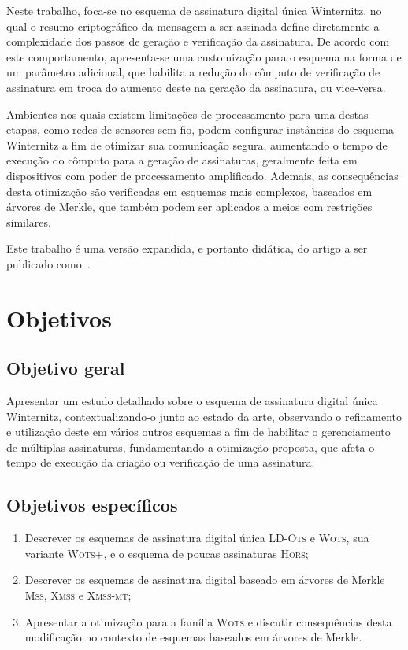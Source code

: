 \documentclass{ufsctex/ufsctex}
\newcommand{\lots}{\textsc{LD-Ots}}
\newcommand{\wots}{\textsc{Wots}}
\newcommand{\wotsplus}{\textsc{Wots+}}
\newcommand{\hors}{\textsc{Hors}}
\newcommand{\mss}{\textsc{Mss}}
\newcommand{\xmss}{\textsc{Xmss}}
\newcommand{\xmssmt}{\textsc{Xmss-mt}}
\begin{document}
Neste trabalho, foca-se no esquema de assinatura digital única Winternitz, no
qual o resumo criptográfico da mensagem a ser assinada define diretamente a
complexidade dos passos de geração e verificação da assinatura. De acordo com
este comportamento, apresenta-se uma customização para o esquema na forma de um
parâmetro adicional, que habilita a redução do cômputo de verificação de
assinatura em troca do aumento deste na geração da assinatura, ou vice-versa.

Ambientes nos quais existem limitações de processamento para uma destas etapas,
como redes de sensores sem fio, podem configurar instâncias do esquema
Winternitz a fim de otimizar sua comunicação segura, aumentando o tempo de
execução do cômputo para a geração de assinaturas, geralmente feita em
dispositivos com poder de processamento amplificado. Ademais, as consequências
desta otimização são verificadas em esquemas mais complexos, baseados em
árvores de Merkle, que também podem ser aplicados a meios com restrições
similares.

Este trabalho é uma versão expandida, e portanto didática, do artigo a ser
publicado como~\cite{Peri1806:Tuning}.

\section{Objetivos}\label{section:objectives}

\subsection{Objetivo geral}\label{subsection:general}

Apresentar um estudo detalhado sobre o esquema de assinatura digital única
Winternitz, contextualizando-o junto ao estado da arte, observando o
refinamento e utilização deste em vários outros esquemas a fim de habilitar o
gerenciamento de múltiplas assinaturas, fundamentando a otimização proposta,
que afeta o tempo de execução da criação ou verificação de uma assinatura.

\subsection{Objetivos específicos}\label{subsection:specific}

\begin{enumerate}[label=\roman*.]

  \item Descrever os esquemas de assinatura digital única \lots{} e \wots{},
      sua variante \wotsplus{}, e o esquema de poucas assinaturas \hors{};

  \item Descrever os esquemas de assinatura digital baseado em árvores de
      Merkle \mss{}, \xmss{} e \xmssmt{};

  \item Apresentar a otimização para a família \wots{} e discutir consequências
      desta modificação no contexto de esquemas baseados em árvores de Merkle.

\end{enumerate}
\end{document}
